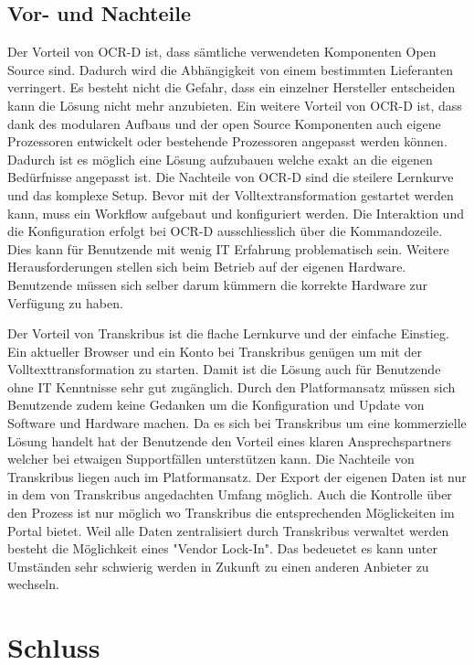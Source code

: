 \documentclass[a4paper,oneside, 12pt]{report}
\begin{document}
\section{Vor- und Nachteile}
Der Vorteil von OCR-D ist, dass sämtliche verwendeten Komponenten Open Source sind. Dadurch wird die Abhängigkeit von einem bestimmten Lieferanten verringert. Es besteht nicht die Gefahr, dass ein einzelner Hersteller entscheiden kann die Lösung nicht mehr anzubieten. Ein weitere Vorteil von OCR-D ist, dass dank des modularen Aufbaus und der open Source Komponenten auch eigene Prozessoren entwickelt oder bestehende Prozessoren angepasst werden können. Dadurch ist es möglich eine Lösung aufzubauen welche exakt an die eigenen Bedürfnisse angepasst ist.
Die Nachteile von OCR-D sind die steilere Lernkurve und das komplexe Setup. Bevor mit der Volltextransformation gestartet werden kann, muss ein Workflow aufgebaut und konfiguriert werden. Die Interaktion und die Konfiguration erfolgt bei OCR-D ausschliesslich über die Kommandozeile. Dies kann für Benutzende mit wenig IT Erfahrung problematisch sein. Weitere Herausforderungen stellen sich beim Betrieb auf der eigenen Hardware. Benutzende müssen sich selber darum kümmern die korrekte Hardware zur Verfügung zu haben.

Der Vorteil von Transkribus ist die flache Lernkurve und der einfache Einstieg. Ein aktueller Browser und ein Konto bei Transkribus genügen um mit der Volltexttransformation zu starten. Damit ist die Lösung auch für Benutzende ohne IT Kenntnisse sehr gut zugänglich. Durch den Platformansatz müssen sich Benutzende zudem keine Gedanken um die Konfiguration und Update von Software und Hardware machen. Da es sich bei Transkribus um eine kommerzielle Lösung handelt hat der Benutzende den Vorteil eines klaren Ansprechspartners welcher bei etwaigen Supportfällen unterstützen kann.
Die Nachteile von Transkribus liegen auch im Platformansatz. Der Export der eigenen Daten ist nur in dem von Transkribus angedachten Umfang möglich. Auch die Kontrolle über den Prozess ist nur möglich wo Transkribus die entsprechenden Möglickeiten im Portal bietet. Weil alle Daten zentralisiert durch Transkribus verwaltet werden besteht die Möglichkeit eines "Vendor Lock-In". Das bedeuetet es kann unter Umständen sehr schwierig werden in Zukunft zu einen anderen Anbieter zu wechseln.

\chapter{Schluss}\label{sec:schluss}
\end{document}
